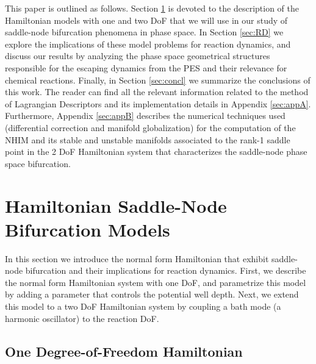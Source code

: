 \documentclass{ws-ijbc}
\begin{document}
This paper is outlined as follows. Section \ref{sec:HSN_MODELS} is devoted to the description of the Hamiltonian models with one and two DoF that we will use in our study of saddle-node bifurcation phenomena in phase space. In Section \ref{sec:RD} we explore the implications of these model problems for reaction dynamics, and discuss our results by analyzing the phase space geometrical structures responsible for the escaping dynamics from the PES and their relevance for chemical reactions. Finally, in Section \ref{sec:concl} we summarize the conclusions of this work. The reader can find all the relevant information related to the method of Lagrangian Descriptors and its implementation details in Appendix \ref{sec:appA}. Furthermore, Appendix \ref{sec:appB} describes the numerical techniques used (differential correction and manifold globalization) for the computation of the NHIM and its stable and unstable manifolds associated to the rank-1 saddle point in the 2 DoF Hamiltonian system that characterizes  the saddle-node phase space bifurcation. 

\section{Hamiltonian Saddle-Node Bifurcation Models}
\label{sec:HSN_MODELS}

In this section we introduce the normal form Hamiltonian that exhibit saddle-node bifurcation and their implications for reaction dynamics. First, we describe the normal form Hamiltonian system with one DoF, and parametrize this model by adding a parameter that controls the potential well depth. Next, we extend this model to a two DoF Hamiltonian system by coupling a bath mode (a harmonic oscillator) to the reaction DoF.


\subsection{One Degree-of-Freedom Hamiltonian}
\label{sec:HSN_1DOF}
\end{document}
